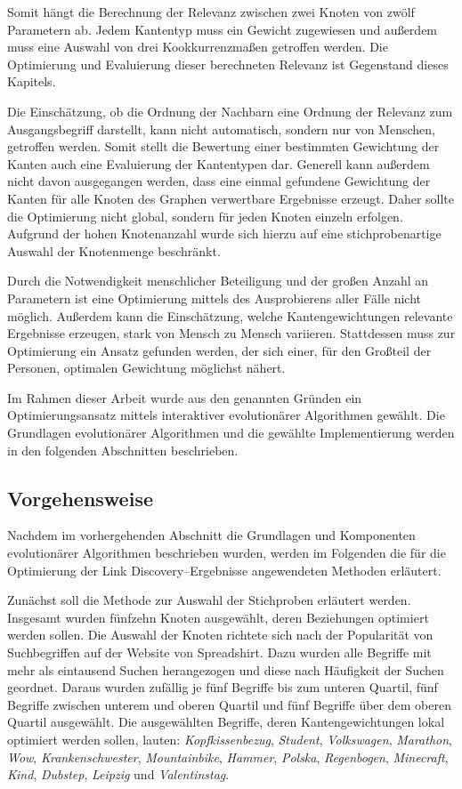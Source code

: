 Somit hängt die Berechnung der Relevanz zwischen zwei Knoten von zwölf Parametern ab. Jedem Kantentyp muss ein Gewicht zugewiesen und außerdem muss eine Auswahl von drei Kookkurrenzmaßen getroffen werden. Die Optimierung und Evaluierung dieser berechneten Relevanz ist Gegenstand dieses Kapitels.

Die Einschätzung, ob die Ordnung der Nachbarn eine Ordnung der Relevanz zum Ausgangsbegriff darstellt, kann nicht automatisch, sondern nur von Menschen, getroffen werden. Somit stellt die Bewertung einer bestimmten Gewichtung der Kanten auch eine Evaluierung der Kantentypen dar.
Generell kann außerdem nicht davon ausgegangen werden, dass eine einmal gefundene Gewichtung der Kanten für alle Knoten des Graphen verwertbare Ergebnisse erzeugt. Daher sollte die Optimierung nicht global, sondern für jeden Knoten einzeln erfolgen. Aufgrund der hohen Knotenanzahl wurde sich hierzu auf eine stichprobenartige Auswahl der Knotenmenge beschränkt.

Durch die Notwendigkeit menschlicher Beteiligung und der großen Anzahl an Parametern ist eine Optimierung mittels des Ausprobierens aller Fälle nicht möglich. Außerdem kann die Einschätzung, welche Kantengewichtungen relevante Ergebnisse erzeugen, stark von Mensch zu Mensch variieren. Stattdessen muss zur Optimierung ein Ansatz gefunden werden, der sich einer, für den Großteil der Personen, optimalen Gewichtung möglichst nähert. 

Im Rahmen dieser Arbeit wurde aus den genannten Gründen ein Optimierungsansatz mittels interaktiver evolutionärer Algorithmen gewählt. Die Grundlagen evolutionärer Algorithmen und die gewählte Implementierung werden in den folgenden Abschnitten beschrieben.

\subsection{Vorgehensweise}
\label{evo_implementation}

Nachdem im vorhergehenden Abschnitt die Grundlagen und Komponenten evolutionärer Algorithmen beschrieben wurden, werden im Folgenden die für die Optimierung der Link Discovery--Ergebnisse angewendeten Methoden erläutert.

Zunächst soll die Methode zur Auswahl der Stichproben erläutert werden. Insgesamt wurden fünfzehn Knoten ausgewählt, deren Beziehungen optimiert werden sollen. Die Auswahl der Knoten richtete sich nach der Popularität von Suchbegriffen auf der Website von Spreadshirt. Dazu wurden alle Begriffe mit mehr als eintausend Suchen herangezogen und diese nach Häufigkeit der Suchen geordnet. Daraus wurden zufällig je fünf Begriffe bis zum unteren Quartil, fünf Begriffe zwischen unterem und oberen Quartil und fünf Begriffe über dem oberen Quartil ausgewählt. Die ausgewählten Begriffe, deren Kantengewichtungen lokal optimiert werden sollen, lauten: \emph{Kopfkissenbezug}, \emph{Student}, \emph{Volkswagen}, \emph{Marathon}, \emph{Wow}, \emph{Krankenschwester}, \emph{Mountainbike}, \emph{Hammer}, \emph{Polska}, \emph{Regenbogen}, \emph{Minecraft}, \emph{Kind}, \emph{Dubstep}, \emph{Leipzig} und \emph{Valentinstag}.

